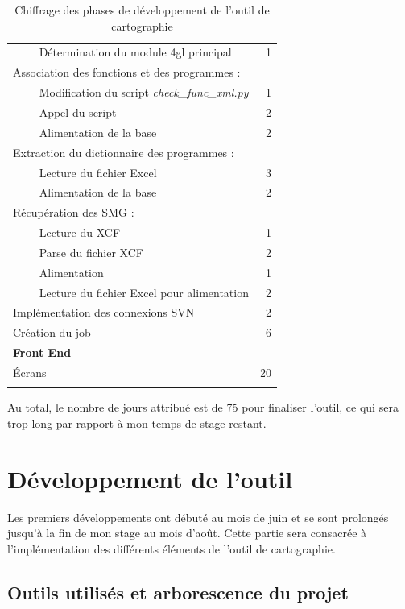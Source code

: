 \documentclass{polytech/polytech}
\begin{document}
\begin{longtable}{|L{12cm}|r|}
	~~\llap{\textbullet}~~ Détermination du module 4gl principal & 1 \\
	Association des fonctions et des programmes : & \\
	~~\llap{\textbullet}~~ Modification du script \textit{check\_func\_xml.py} & 1 \\ 
	~~\llap{\textbullet}~~ Appel du script & 2 \\ 
	~~\llap{\textbullet}~~ Alimentation de la base & 2 \\ 
	Extraction du dictionnaire des programmes : & \\
	~~\llap{\textbullet}~~ Lecture du fichier Excel & 3 \\ 
	~~\llap{\textbullet}~~ Alimentation de la base & 2 \\ 
	Récupération des SMG : & \\
	~~\llap{\textbullet}~~ Lecture du XCF & 1 \\ 
	~~\llap{\textbullet}~~ Parse du fichier XCF & 2 \\ 
	~~\llap{\textbullet}~~ Alimentation & 1 \\ 
	~~\llap{\textbullet}~~ Lecture du fichier Excel pour alimentation & 2 \\ 
	Implémentation des connexions SVN & 2 \\
	\hline 
	Création du job	& 6 \\ 
	\hline 
	\textbf{Front End} &  \\ 
	Écrans & 20 \\
	\hline 
	\caption{Chiffrage des phases de développement de l'outil de cartographie }
\end{longtable} 


Au total, le nombre de jours attribué est de 75 pour finaliser l'outil, ce qui sera trop long par rapport à mon temps de stage restant. 

\part{Développement de l'outil}
\label{part:dev}

Les premiers développements ont débuté au mois de juin et se sont prolongés jusqu'à la fin de mon stage au mois d'août. Cette partie sera consacrée à l'implémentation des différents éléments de l'outil de cartographie.

\chapter{Outils utilisés et arborescence du projet}
\end{document}
